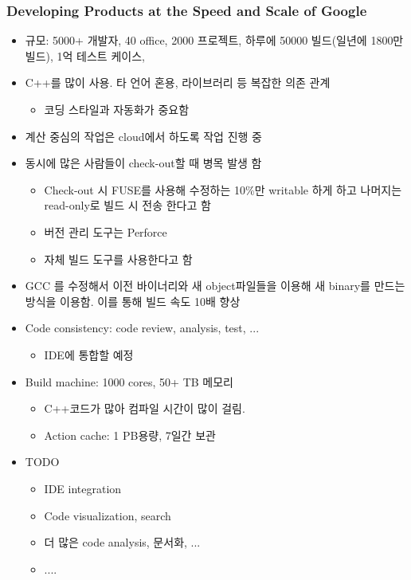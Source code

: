 \begin{frame}[allowframebreaks]
\frametitle{Developing Products at the Speed and Scale of Google}

\begin{itemize}

\item 규모: 5000+ 개발자, 40 office, 2000 프로젝트, 하루에 50000 빌드(일년에 1800만 빌드), 1억  테스트 케이스,  

\item C++를 많이 사용. 타 언어 혼용, 라이브러리 등 복잡한 의존 관계
    \begin{itemize}
    \item 코딩 스타일과 자동화가 중요함
    \end{itemize}

\item 계산 중심의 작업은 cloud에서 하도록 작업 진행 중

\item 동시에 많은 사람들이 check-out할 때 병목 발생 함
    \begin{itemize}
    \item Check-out 시 FUSE를 사용해 수정하는 10\%만 writable 하게 하고 나머지는 read-only로 빌드 시 전송 한다고 함
    \item 버전 관리 도구는 Perforce
    \item 자체 빌드 도구를 사용한다고 함
    \end{itemize}
\item GCC 를 수정해서  이전 바이너리와 새 object파일들을 이용해 새 binary를 만드는 방식을 이용함. 이를 통해 빌드 속도 10배 향상

\item Code consistency: code review, analysis, test, ...
    \begin{itemize}
    \item IDE에 통합할 예정
    \end{itemize}

\item Build machine: 1000 cores, 50+ TB 메모리
    \begin{itemize}
    \item C++코드가 많아 컴파일 시간이 많이 걸림.
    \item Action cache: 1 PB용량, 7일간 보관
    \end{itemize}

\item TODO
    \begin{itemize}
    \item IDE integration 
    \item Code  visualization, search
    \item 더 많은 code analysis, 문서화, ...
    \item .... 
    \end{itemize}
\end{itemize}

\end{frame}
